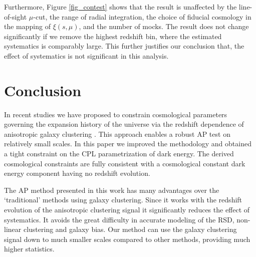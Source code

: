 \documentclass[iop]{emulateapj}
\begin{document}
Furthermore, Figure \ref{fig_contest} shows that 
the result is unaffected by the line-of-sight $\mu$-cut, 
the range of radial integration, 
the choice of fiducial cosmology in the mapping of $\xi(s,\mu)$,
and the number of mocks.
The result does not change significantly if we remove the highest redshift bin,
where the estimated systematics is comparably large.
This further justifies our conclusion that, the effect of systematics is not significant in this analysis.


\section{Conclusion}

In recent studies we have proposed to constrain cosmological parameters 
governing the expansion history of the universe via 
the redshift dependence of anisotropic galaxy clustering \citep{Li2014,Li2015,Li2016}.
This approach enables a robust AP test on relatively small scales.
In this paper we improved the methodology and obtained a tight constraint 
on the CPL parametrization of dark energy.
The derived cosmological constraints are fully consistent with a cosmological constant 
dark energy component having no redshift evolution.


The AP method presented in this work has many advantages over the 
`traditional' methods using galaxy clustering.
Since it works with the redshift evolution of the anisotropic clustering signal it significantly reduces the effect of systematics. 
It avoids the great difficulty in accurate modeling of the RSD, non-linear clustering and galaxy bias.
Our method can use the galaxy clustering signal down to
much smaller scales compared to other methods,
providing much higher statistics.
\end{document}

